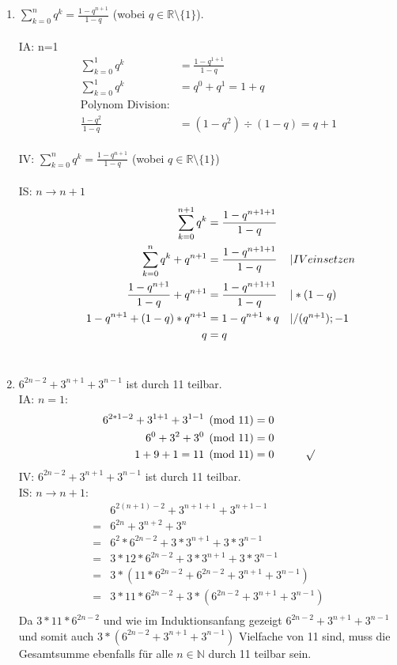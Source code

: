 \documentclass[12pt,letterpaper]{article}
\newcommand{\alignleft}[1]{\tag*{\llap{\makebox[\linewidth][l]{$#1$}}}}
\newcommand{\LLeftrightarrow}{ \alignleft{\Leftrightarrow}}
\newcommand{\eqinfo}[1]{&\makebox[2cm][l]{$\vert #1$}}
\newcommand{\Eqn}[3]{#1 &#2 #3}
\newcommand{\eqnf}[2]{\Eqn{#1}{=}{#2}\\}
\newcommand{\eqn}[2]{\LLeftrightarrow\Eqn{#1}{=}{#2}\\}
\newcommand{\eqni}[3]{\LLeftrightarrow\Eqn{#1}{=}{#2}\eqinfo{#3}\\}
\begin{document}
\begin{enumerate}
\begin{enumerate}
\item $\sum\limits_{k=0}^{n}q^k = \frac{1-q^{n+1}}{1-q}$ (wobei $q\in\mathbb{R}\setminus\{1\}$).\\ \\
IA: n=1
\begin{align*}
	\sum_{k=0}^{1}q^k &= \frac{1-q^{1+1}}{1-q}\\
	\sum_{k=0}^{1}q^k&=q^0+q^1=1+q\\
	\text{Polynom Division:}\\
	\frac{1-q^2}{1-q} &= (1-q^2)\div (1-q) = q+1
\end{align*}\\

IV: $\sum\limits_{k=0}^{n}q^k = \frac{1-q^{n+1}}{1-q}$ (wobei $q\in\mathbb{R}\setminus\{1\}$)\\
\\
IS: $n\to n+1$\\
\begin{align*}
	\eqnf{\sum_{k=0}^{n+1}q^k}{\frac{1-q^{n+1+1}}{1-q}}
	\eqni{\sum_{k=0}^{n}q^k+q^{n+1}}{\frac{1-q^{n+1+1}}{1-q}}{IV einsetzen}
	\eqni{\frac{1-q^{n+1}}{1-q}+q^{n+1}}{\frac{1-q^{n+1+1}}{1-q}}{*(1-q)}
	\eqni{1-q^{n+1}+(1-q)*q^{n+1}}{1-q^{n+1}*q}{/(q^{n+1});-1}
	\eqn{q}{q}	
\end{align*}
\\
\item $6^{2n-2}+3^{n+1}+3^{n-1}$ ist durch 11 teilbar.\\
IA: $n=1$: 
\begin{align*}
\eqnf{6^{2*1-2}+3^{1+1}+3^{1-1} \pmod{11}}{0}
\eqn{6^0+3^2+3^0 \pmod{11}}{0}
\eqn{1+9+1 = 11 \pmod{11}}{0\makebox[1cm]{}\surd}
\end{align*}
IV: $6^{2n-2}+3^{n+1}+3^{n-1}$ ist durch 11 teilbar.\\
IS: $n\to n+1$:
\begin{align*}
&6^{2(n+1)-2}+3^{n+1+1}+3^{n+1-1}\\
= &6^{2n}+3^{n+2}+3^{n}\\
= &6^2*6^{2n-2}+3*3^{n+1}+3*3^{n-1}\\ 
= &3*12*6^{2n-2}+3*3^{n+1}+3*3^{n-1}\\
= &3*(11*6^{2n-2}+6^{2n-2}+3^{n+1}+3^{n-1})\\
= &3*11*6^{2n-2}+ 3*(6^{2n-2}+3^{n+1}+3^{n-1})\\
\end{align*}
Da $3*11*6^{2n-2}$ und wie im Induktionsanfang gezeigt $6^{2n-2}+3^{n+1}+3^{n-1}$ und somit auch $3*(6^{2n-2}+3^{n+1}+3^{n-1})$ Vielfache von 11 sind, muss die Gesamtsumme ebenfalls für alle $n\in\mathbb{N}$ durch 11 teilbar sein.

\end{enumerate}
\end{enumerate}
\end{document}

